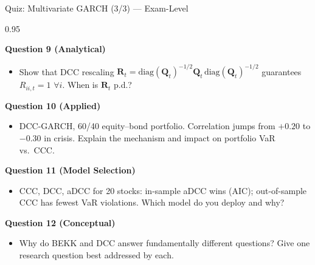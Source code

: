 \documentclass[9pt, aspectratio=169, t]{beamer}
\begin{document}
\begin{frame}{Quiz: Multivariate GARCH (3/3) --- Exam-Level}
    \begin{cminipage}{0.95\textwidth}
    \vspace{-2mm}
    {\scriptsize
    \textcolor{MainBlue}{\textbf{Question 9 (Analytical)}}
    \begin{itemize}\setlength{\itemsep}{0pt}\setlength{\topsep}{0pt}
        \item Show that DCC rescaling $\mathbf{R}_t = \text{diag}(\mathbf{Q}_t)^{-1/2}\mathbf{Q}_t\,\text{diag}(\mathbf{Q}_t)^{-1/2}$ guarantees $R_{ii,t} = 1$ $\forall i$. When is $\mathbf{R}_t$ p.d.?
    \end{itemize}
    \vspace{-1mm}
    \textcolor{MainBlue}{\textbf{Question 10 (Applied)}}
    \begin{itemize}\setlength{\itemsep}{0pt}\setlength{\topsep}{0pt}
        \item DCC-GARCH, 60/40 equity--bond portfolio. Correlation jumps from $+0.20$ to $-0.30$ in crisis. Explain the mechanism and impact on portfolio VaR vs.\ CCC.
    \end{itemize}
    \vspace{-1mm}
    \textcolor{MainBlue}{\textbf{Question 11 (Model Selection)}}
    \begin{itemize}\setlength{\itemsep}{0pt}\setlength{\topsep}{0pt}
        \item CCC, DCC, aDCC for 20 stocks: in-sample aDCC wins (AIC); out-of-sample CCC has fewest VaR violations. Which model do you deploy and why?
    \end{itemize}
    \vspace{-1mm}
    \textcolor{MainBlue}{\textbf{Question 12 (Conceptual)}}
    \begin{itemize}\setlength{\itemsep}{0pt}\setlength{\topsep}{0pt}
        \item Why do BEKK and DCC answer fundamentally different questions? Give one research question best addressed by each.
    \end{itemize}
    }
    \end{cminipage}
\end{frame}
\end{document}
